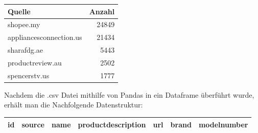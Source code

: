 \documentclass[paper=a4,12pt,listof=totoc]{scrartcl}%
\begin{document}
	\begin{tabular}[h]{|l|r|}
		\hline 
		Quelle & Anzahl \\ \hline 
		shopee.my&24849\\
		appliancesconnection.us&21434\\
		sharafdg.ae&5443\\
		productreview.au&2502\\
		spencerstv.us&1777\\ \hline
	\end{tabular}
	\newline
	
	Nachdem die .csv Datei mithilfe von Pandas in ein Dataframe überführt wurde, erhält man die Nachfolgende Datenstruktur:\\
	
	\begin{tabular}[h]{|c|c|c|c|c|c|c|}
		\hline 
		id & source & name & productdescription & url & brand & modelnumber \\ \hline 
	\end{tabular}
	\newline
	
\end{document}
